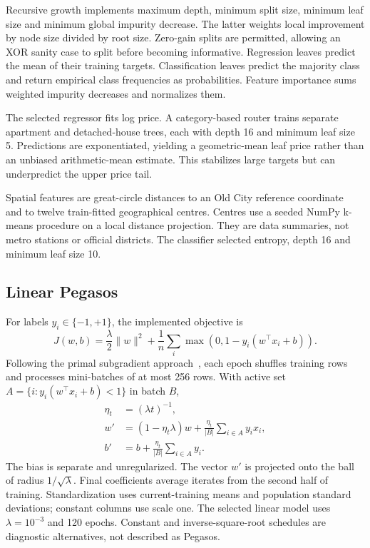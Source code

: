 \documentclass[10pt,twocolumn,a4paper]{article}
\begin{document}
Recursive growth implements maximum depth, minimum split size, minimum leaf size and minimum global impurity decrease. The latter weights local improvement by node size divided by root size. Zero-gain splits are permitted, allowing an XOR sanity case to split before becoming informative. Regression leaves predict the mean of their training targets. Classification leaves predict the majority class and return empirical class frequencies as probabilities. Feature importance sums weighted impurity decreases and normalizes them.

The selected regressor fits log price. A category-based router trains separate apartment and detached-house trees, each with depth 16 and minimum leaf size 5. Predictions are exponentiated, yielding a geometric-mean leaf price rather than an unbiased arithmetic-mean estimate. This stabilizes large targets but can underpredict the upper price tail.

Spatial features are great-circle distances to an Old City reference coordinate~\cite{unesco} and to twelve train-fitted geographical centres. Centres use a seeded NumPy k-means procedure on a local distance projection. They are data summaries, not metro stations or official districts. The classifier selected entropy, depth 16 and minimum leaf size 10.

\subsection{Linear Pegasos}
For labels $y_i\in\{-1,+1\}$, the implemented objective is
\begin{equation}
J(w,b)=\frac{\lambda}{2}\|w\|^2+
\frac1n\sum_i\max(0,1-y_i(w^\top x_i+b)).
\end{equation}
Following the primal subgradient approach~\cite{pegasos}, each epoch shuffles training rows and processes mini-batches of at most 256 rows. With active set $A=\{i:y_i(w^\top x_i+b)<1\}$ in batch $B$,
\begin{align}
\eta_t&=(\lambda t)^{-1},\\
w'&=(1-\eta_t\lambda)w+\frac{\eta_t}{|B|}\sum_{i\in A}y_i x_i,\\
b'&=b+\frac{\eta_t}{|B|}\sum_{i\in A}y_i .
\end{align}
The bias is separate and unregularized. The vector $w'$ is projected onto the ball of radius $1/\sqrt{\lambda}$. Final coefficients average iterates from the second half of training. Standardization uses current-training means and population standard deviations; constant columns use scale one. The selected linear model uses $\lambda=10^{-3}$ and 120 epochs. Constant and inverse-square-root schedules are diagnostic alternatives, not described as Pegasos.
\end{document}
